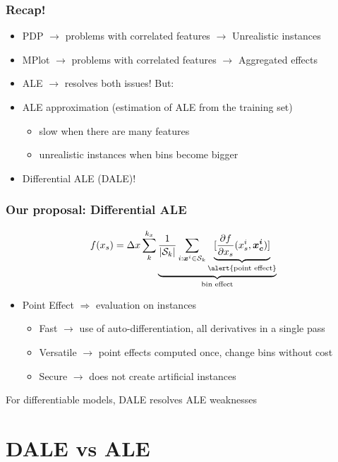\documentclass{beamer}
\newcommand{\xb}{\boldsymbol{x}}
\begin{document}
\begin{frame}
  \frametitle{Recap!}
  \begin{itemize}
  \item PDP \(\rightarrow\) problems with correlated features \(\rightarrow\) Unrealistic instances
  \item MPlot \(\rightarrow\) problems with correlated features \(\rightarrow\) Aggregated effects
  \item ALE \(\rightarrow\) resolves both issues! But:

  \item ALE approximation (estimation of ALE from the training set)
    \begin{itemize}
    \item slow when there are many features
      \item unrealistic instances when bins become bigger
      \end{itemize}
      \item Differential ALE (DALE)!
  \end{itemize}
  \end{frame}


\begin{frame}
  \frametitle{Our proposal: Differential ALE}
    \[f(x_s) = \Delta x \sum_k^{k_x} \underbrace{\frac{1}{|\mathcal{S}_k|} \sum_{i:\xb^i \in \mathcal{S}_k} \underbrace{[\frac{\partial f}{\partial x_s}(x_s^i, \bm{x^i_c})]}_{\text{\alert{point effect}}}}_{\text{bin effect}} \]

    \begin{itemize}
      \item Point Effect \(\Rightarrow\) evaluation \alert{on instances}
    \begin{itemize}
    \item Fast \( \rightarrow \) use of auto-differentiation, all derivatives in a single pass
    \item Versatile \( \rightarrow\) point effects computed once, change bins without cost
    \item Secure \( \rightarrow\) does not create artificial instances
    \end{itemize}
    \end{itemize}

  \noindent\makebox[\linewidth]{\rule{\paperwidth}{0.4pt}}
  For \alert{differentiable} models, DALE resolves ALE weaknesses
\end{frame}



\section{DALE vs ALE}
\end{document}
